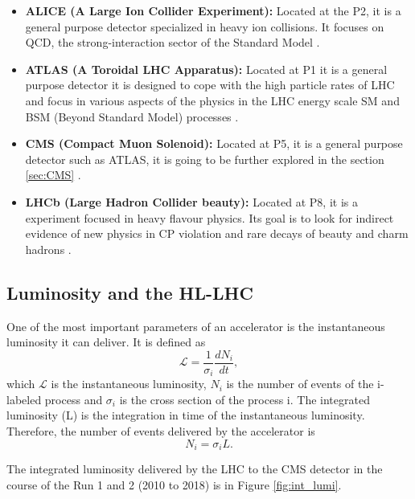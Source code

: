 \begin{itemize}
    \item \textbf{ALICE (A Large Ion Collider Experiment):} Located at the P2, it is a general purpose detector specialized in heavy ion collisions. It focuses on QCD, the strong-interaction sector of the Standard Model \cite{ALICE:2008ngc}.
    \item \textbf{ATLAS (A Toroidal LHC Apparatus):} Located at P1 it is a general purpose detector it is designed to cope with the high particle rates of LHC and focus in various aspects of the physics in the LHC energy scale SM and BSM (Beyond Standard Model) processes \cite{ATLAS:2008xda}.
    \item \textbf{CMS (Compact Muon Solenoid):} Located at P5, it is a general purpose detector such as ATLAS, it is going to be further explored in the section \ref{sec:CMS} \cite{CMS:2008xjf}.
    \item \textbf{LHCb (Large Hadron Collider beauty):} Located at P8, it is a experiment focused in heavy flavour physics. Its goal is to look for indirect evidence of new physics in CP violation and rare decays of beauty and charm hadrons \cite{LHCb:2008vvz}.
\end{itemize}

\subsection{Luminosity and the HL-LHC}

One of the most important parameters of an accelerator is the instantaneous luminosity it can deliver. It is defined as
\begin{equation}
    \mathcal{L} = \frac{1}{\sigma_i} \frac{dN_i}{dt},
\end{equation}
which $\mathcal{L}$ is the instantaneous luminosity, $N_i$ is the number of events of the i-labeled process and $\sigma_i$ is the cross section of the process i. The integrated luminosity (L) is the integration in time of the instantaneous luminosity. Therefore, the number of events delivered by the accelerator is
\begin{equation}
    N_i = \sigma_i L.
\end{equation}

The integrated luminosity delivered by the LHC to the CMS detector in the course of the Run 1 and 2 (2010 to 2018) is in Figure \ref{fig:int_lumi}.

